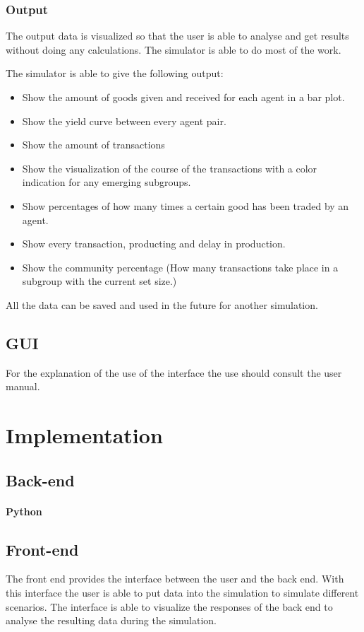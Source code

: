 \documentclass[twoside,openright]{uva-bachelor-thesis}
\begin{document}
\subsection{Output}
The output data is visualized so that the user is able to analyse and get results without doing any calculations. The simulator is able to do most of the work.

The simulator is able to give the following output:
\begin{itemize}
  \item Show the amount of goods given and received for each agent in a bar plot.
  \item Show the yield curve between every agent pair.
  \item Show the amount of transactions
  \item Show the visualization of the course of the transactions with a color indication for any emerging subgroups.
  \item Show percentages of how many times a certain good has been traded by an agent.
  \item Show every transaction, producting and delay in production.
  \item Show the community percentage (How many transactions take place in a subgroup with the current set size.)
\end{itemize}

All the data can be saved and used in the future for another simulation.

\section{GUI}



For the explanation of the use of the interface the use should consult the user manual.


\chapter{Implementation}

\section{Back-end}

\subsubsection{Python}

\section{Front-end}
The front end provides the interface between the user and the back end. With this interface the user is able to put data into the simulation to simulate different scenarios. The interface is able to visualize the responses of the back end to analyse the resulting data during the simulation.
\end{document}
